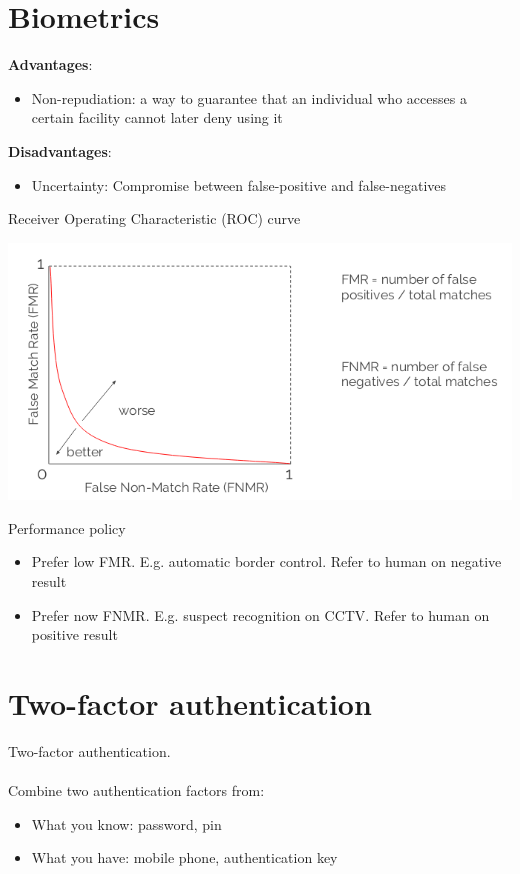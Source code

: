 \documentclass{article}[18pt]
\begin{document}
\section{Biometrics}
\textbf{Advantages}:
\begin{itemize}
	\item Non-repudiation: a way to guarantee that an individual who accesses a certain facility cannot later deny using it
\end{itemize}
\textbf{Disadvantages}:
\begin{itemize}
	\item Uncertainty: Compromise between false-positive and false-negatives
\end{itemize}
Receiver Operating Characteristic (ROC) curve
\begin{center}
	\includegraphics[scale=0.7]{ROC}
\end{center}
Performance policy
\begin{itemize}
	\item Prefer low FMR. E.g. automatic border control. Refer to human on negative result
	\item Prefer now FNMR. E.g. suspect recognition on CCTV. Refer to human on positive result
\end{itemize}
\section{Two-factor authentication}
Two-factor authentication.\\
\\
Combine two authentication factors from:
\begin{itemize}
	\item What you know: password, pin
	\item What you have: mobile phone, authentication key
\end{itemize}
\end{document}
